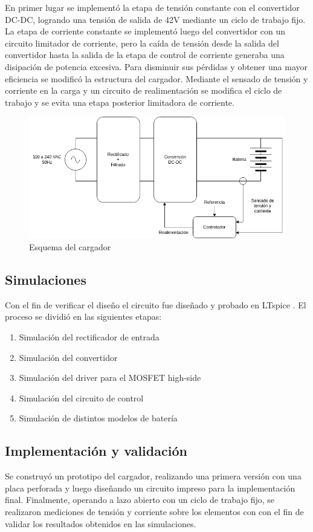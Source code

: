 En primer lugar se implementó la etapa de tensión constante con el convertidor DC-DC, logrando una tensión de salida de 42V mediante un ciclo de trabajo fijo. 
La etapa de corriente constante se implementó luego del convertidor con un circuito limitador de corriente,
pero la caída de tensión desde la salida del convertidor hasta la salida de la etapa de control de corriente generaba una disipación de potencia excesiva.
Para disminuir sus pérdidas y obtener una mayor eficiencia se modificó la estructura del cargador. 
Mediante el sensado de tensión y corriente en la carga y un circuito de realimentación se modifica el ciclo de trabajo y se evita una etapa posterior limitadora de corriente.

\begin{figure}
    \centering
    \includegraphics[width=\textwidth]{images/esquema_cargador_v2.png}
    \caption{Esquema del cargador}
    \label{fig:esquema_cargador}
\end{figure}

\subsection{Simulaciones}
Con el fin de verificar el diseño el circuito fue diseñado y probado en LTspice \cite{ltspice}.
El proceso se dividió en las siguientes etapas:
\begin{enumerate}
    \item Simulación del rectificador de entrada
    \item Simulación del convertidor
    \item Simulación del driver para el MOSFET high-side
    \item Simulación del circuito de control
    \item Simulación de distintos modelos de batería
\end{enumerate}

\subsection{Implementación y validación}
Se construyó un prototipo del cargador, realizando una primera versión con una placa perforada
y luego diseñando un circuito impreso para la implementación final.
Finalmente, operando a lazo abierto con un ciclo de trabajo fijo, se realizaron mediciones de tensión y corriente sobre los elementos con
con el fin de validar los resultados obtenidos en las simulaciones.